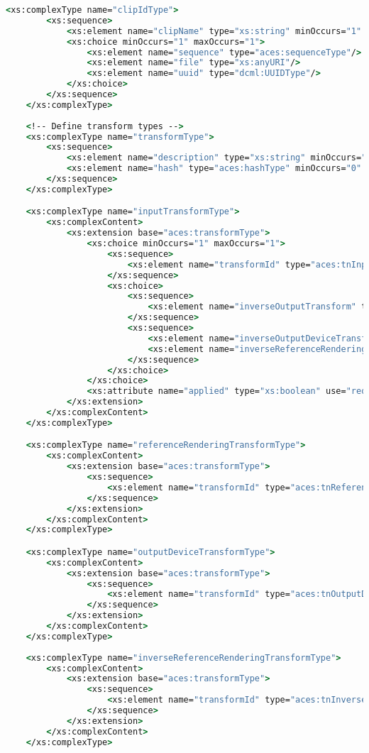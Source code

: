 \begin{lstlisting}[language=csh]
	<xs:complexType name="clipIdType">
		<xs:sequence>
			<xs:element name="clipName" type="xs:string" minOccurs="1" maxOccurs="1"/>
			<xs:choice minOccurs="1" maxOccurs="1">
				<xs:element name="sequence" type="aces:sequenceType"/>
				<xs:element name="file" type="xs:anyURI"/>
				<xs:element name="uuid" type="dcml:UUIDType"/>
			</xs:choice>
		</xs:sequence>
	</xs:complexType>
	
	<!-- Define transform types -->
	<xs:complexType name="transformType">
		<xs:sequence>
			<xs:element name="description" type="xs:string" minOccurs="0" maxOccurs="1"/>
			<xs:element name="hash" type="aces:hashType" minOccurs="0" maxOccurs="1"/>
		</xs:sequence>
	</xs:complexType>

	<xs:complexType name="inputTransformType">
		<xs:complexContent>
			<xs:extension base="aces:transformType">
				<xs:choice minOccurs="1" maxOccurs="1">
					<xs:sequence>
						<xs:element name="transformId" type="aces:tnInputTransform" minOccurs="1" maxOccurs="1"/>
					</xs:sequence>
					<xs:choice>
						<xs:sequence>
							<xs:element name="inverseOutputTransform" type="aces:inverseOutputTransformType" minOccurs="1" maxOccurs="1"/>
						</xs:sequence>
						<xs:sequence>
							<xs:element name="inverseOutputDeviceTransform" type="aces:inverseOutputDeviceTransformType" minOccurs="1" maxOccurs="1"/>
							<xs:element name="inverseReferenceRenderingTransform" type="aces:inverseReferenceRenderingTransformType" minOccurs="1" maxOccurs="1"/>
						</xs:sequence>
					</xs:choice>
				</xs:choice>
				<xs:attribute name="applied" type="xs:boolean" use="required"/>
			</xs:extension>
		</xs:complexContent>
	</xs:complexType>

	<xs:complexType name="referenceRenderingTransformType">
		<xs:complexContent>
			<xs:extension base="aces:transformType">
				<xs:sequence>
					<xs:element name="transformId" type="aces:tnReferenceRenderingTransform" minOccurs="1" maxOccurs="1"/>
				</xs:sequence>
			</xs:extension>
		</xs:complexContent>
	</xs:complexType>

	<xs:complexType name="outputDeviceTransformType">
		<xs:complexContent>
			<xs:extension base="aces:transformType">
				<xs:sequence>
					<xs:element name="transformId" type="aces:tnOutputDeviceTransform" minOccurs="1" maxOccurs="1"/>
				</xs:sequence>
			</xs:extension>
		</xs:complexContent>
	</xs:complexType>
	
	<xs:complexType name="inverseReferenceRenderingTransformType">
		<xs:complexContent>
			<xs:extension base="aces:transformType">
				<xs:sequence>
					<xs:element name="transformId" type="aces:tnInverseReferenceRenderingTransform" minOccurs="1" maxOccurs="1"/>
				</xs:sequence>
			</xs:extension>
		</xs:complexContent>
	</xs:complexType>
	

\end{lstlisting}
